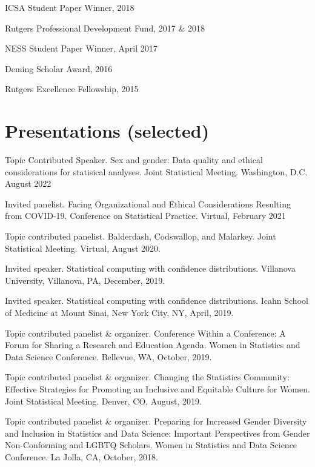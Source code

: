 \documentclass[margin,line]{res}
\begin{document}
\begin{resume}
ICSA Student Paper Winner, 2018
\vspace*{-2.5mm}

Rutgers Professional Development Fund, 2017 \& 2018
\vspace*{-2.5mm}

NESS Student Paper Winner, April 2017
\vspace*{-2.5mm}

Deming Scholar Award, 2016
\vspace*{-2.5mm}

Rutgers Excellence Fellowship, 2015 


\section{\sc Presentations (selected)} 

Topic Contributed Speaker. Sex and gender: Data quality and ethical considerations for statisical analyses. Joint Statistical Meeting. Washington, D.C. August 2022 

Invited panelist. Facing Organizational and Ethical Considerations Resulting from COVID-19. Conference on Statistical Practice. Virtual, February 2021 

Topic contributed panelist. Balderdash, Codswallop, and Malarkey. Joint Statistical Meeting. Virtual, August 2020.

Invited speaker. Statistical computing with confidence distributions. Villanova University, Villanova, PA, December, 2019.

Invited speaker. Statistical computing with confidence distributions. Icahn School of Medicine at Mount Sinai, New York City, NY, April, 2019.

Topic contributed panelist \& organizer. Conference Within a Conference: A Forum for Sharing a Research and Education Agenda. Women in Statistics and Data Science Conference. Bellevue, WA, October, 2019.

Topic contributed panelist \& organizer. Changing the Statistics Community: Effective Strategies for Promoting an Inclusive and Equitable Culture for Women. Joint Statistical Meeting. Denver, CO, August, 2019.

Topic contributed panelist \& organizer. Preparing for Increased Gender Diversity and Inclusion in Statistics and Data Science: Important Perspectives from Gender Non-Conforming and LGBTQ Scholars. Women in Statistics and Data Science Conference. La Jolla, CA, October, 2018.


\end{resume}
\end{document}
